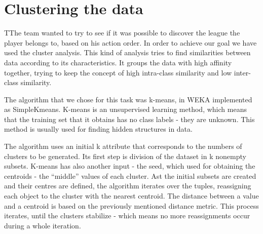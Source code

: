 \documentclass[a4paper,11pt]{article}
\begin{document}
\section{Clustering the data}
TThe team wanted to try to see if it was possible to discover the league the player belongs to, based on his action order. In order to achieve our goal we have used the cluster analysis. This kind of analysis tries to find similarities between data according to its characteristics. It groups the data with high affinity together, trying to keep the concept of high intra-class similarity and low inter-class similarity.

The algorithm that we chose for this task was k-means, in WEKA implemented as SimpleKmeans. K-means is an unsupervised learning method, which means that the training set that it obtains has no class labels - they are unknown. This method is usually used for finding hidden structures in data.

The algorithm uses an initial k attribute that corresponds to the numbers of clusters to be generated. Its first step is division of the dataset in k nonempty subsets. K-means has also another input - the seed, which used for obtaining the centroids -  the “middle” values of each cluster. Ast the initial subsets are created and their centres are defined, the algorithm iterates over the tuples, reassigning each object to the cluster with the nearest centroid. The distance between a value and a centroid is based on the previously mentioned distance metric. This process iterates, until the clusters stabilize - which means no more reassignments occur during a whole iteration.
\end{document}
